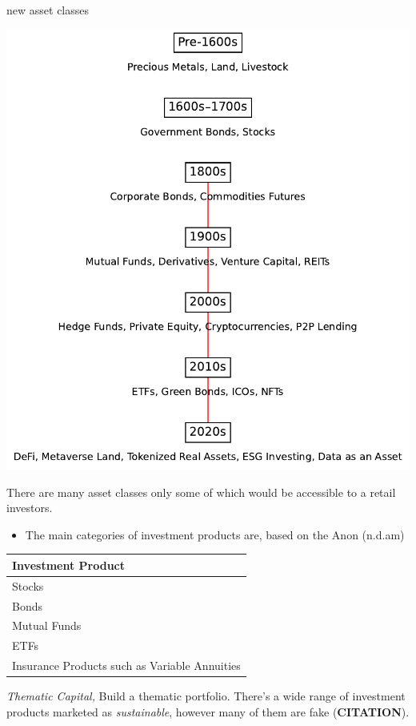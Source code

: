 \documentclass[
  letterpaper,
  DIV=11,
  numbers=noendperiod]{scrartcl}
\providecommand{\tightlist}{%
  \setlength{\itemsep}{0pt}\setlength{\parskip}{0pt}}\usepackage{longtable,booktabs,array}
\begin{document}
new asset classes

\includegraphics{_thesis_files/figure-pdf/cell-39-output-1.pdf}

There are many asset classes only some of which would be accessible to a
retail investors.

\begin{itemize}
\tightlist
\item
  The main categories of investment products are, based on the Anon
  (n.d.am)
\end{itemize}

\begin{longtable}[]{@{}l@{}}
\toprule\noalign{}
Investment Product \\
\midrule\noalign{}
\endhead
\bottomrule\noalign{}
\endlastfoot
Stocks \\
Bonds \\
Mutual Funds \\
ETFs \\
Insurance Products such as Variable Annuities \\
\end{longtable}

\emph{Thematic Capital,} Build a thematic portfolio. There's a wide
range of investment products marketed as \emph{sustainable}, however
many of them are fake (\textbf{CITATION}).
\end{document}
